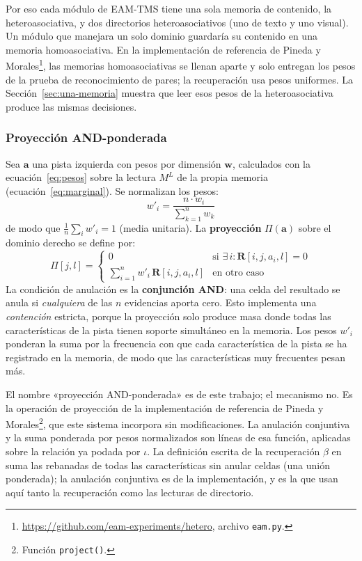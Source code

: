 Por eso cada módulo de EAM-TMS tiene una sola memoria de contenido, la
heteroasociativa, y dos directorios heteroasociativos (uno de texto y uno visual).
Un módulo que manejara un solo dominio guardaría su contenido en una memoria
homoasociativa.
En la implementación de referencia de Pineda y
Morales\footnote{\url{https://github.com/eam-experiments/hetero}, archivo \texttt{eam.py}.},
las memorias homoasociativas se llenan aparte y solo entregan los pesos de la prueba de
reconocimiento de pares; la recuperación usa pesos uniformes.
La Sección~\ref{sec:una-memoria} muestra que leer esos pesos de la heteroasociativa
produce las mismas decisiones.

\subsubsection*{Proyección AND-ponderada}

Sea $\mathbf{a}$ una pista izquierda con pesos por dimensión $\mathbf{w}$, calculados
con la ecuación~\eqref{eq:pesos} sobre la lectura $M^{L}$ de la propia memoria
(ecuación~\eqref{eq:marginal}).
Se normalizan los pesos:
\begin{equation}
    w'_i = \frac{n \cdot w_i}{\displaystyle\sum_{k=1}^{n} w_k}
    \label{eq:normalizacion-pesos}
\end{equation}
de modo que $\frac{1}{n}\sum_i w'_i = 1$ (media unitaria).
La \textbf{proyección} $\Pi(\mathbf{a})$ sobre el dominio derecho se define por:
\begin{equation}
    \Pi[j, l] = \begin{cases}
        0 & \text{si } \exists\, i : \mathbf{R}[i, j, a_i, l] = 0 \\[4pt]
        \displaystyle\sum_{i=1}^{n} w'_i\, \mathbf{R}[i, j, a_i, l] & \text{en otro caso}
    \end{cases}
    \label{eq:proyeccion-AND}
\end{equation}
La condición de anulación es la \textbf{conjunción AND}: una celda del resultado se
anula si \emph{cualquiera} de las $n$ evidencias aporta cero.
Esto implementa una \emph{contención} estricta, porque la proyección solo produce masa
donde todas las características de la pista tienen soporte simultáneo en la memoria.
Los pesos $w'_i$ ponderan la suma por la frecuencia con que cada característica de la
pista se ha registrado en la memoria, de modo que las características muy frecuentes
pesan más.

El nombre «proyección AND-ponderada» es de este trabajo; el mecanismo no.
Es la operación de proyección de la implementación de referencia de Pineda y
Morales\footnote{Función \texttt{project()}.}, que este sistema incorpora sin
modificaciones.
La anulación conjuntiva y la suma ponderada por pesos normalizados son líneas de esa
función, aplicadas sobre la relación ya podada por $\iota$.
La definición escrita de la recuperación $\beta$ en \cite{morales2025missing} suma las
rebanadas de todas las características sin anular celdas (una unión ponderada); la
anulación conjuntiva es de la implementación, y es la que usan aquí tanto la
recuperación como las lecturas de directorio.

